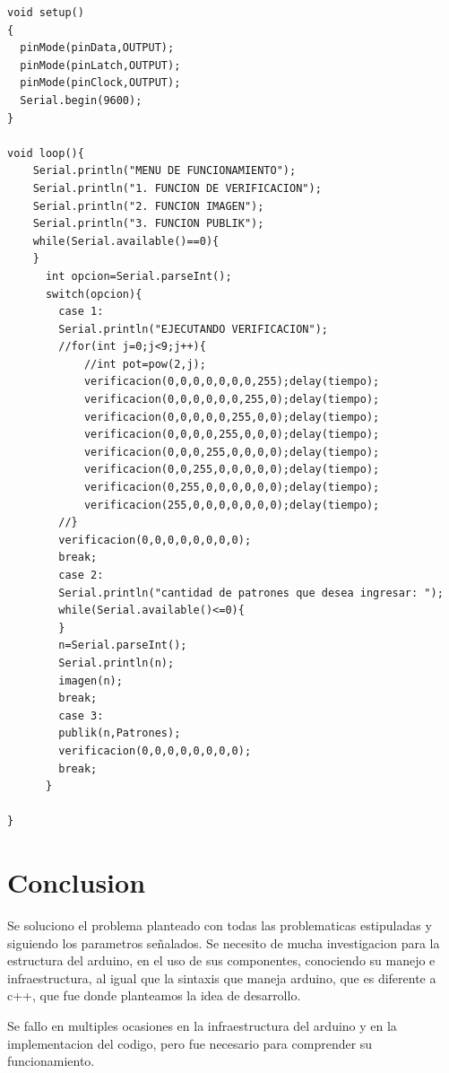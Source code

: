 \documentclass{article}
\begin{document}
\begin{verbatim}
void setup()
{
  pinMode(pinData,OUTPUT);
  pinMode(pinLatch,OUTPUT);
  pinMode(pinClock,OUTPUT);
  Serial.begin(9600);
}

void loop(){
  	Serial.println("MENU DE FUNCIONAMIENTO");
    Serial.println("1. FUNCION DE VERIFICACION");
    Serial.println("2. FUNCION IMAGEN");
    Serial.println("3. FUNCION PUBLIK");
    while(Serial.available()==0){
    }
      int opcion=Serial.parseInt();
      switch(opcion){
      	case 1:
        Serial.println("EJECUTANDO VERIFICACION");
        //for(int j=0;j<9;j++){
            //int pot=pow(2,j);
        	verificacion(0,0,0,0,0,0,0,255);delay(tiempo);
            verificacion(0,0,0,0,0,0,255,0);delay(tiempo);
            verificacion(0,0,0,0,0,255,0,0);delay(tiempo);
            verificacion(0,0,0,0,255,0,0,0);delay(tiempo);
            verificacion(0,0,0,255,0,0,0,0);delay(tiempo);
            verificacion(0,0,255,0,0,0,0,0);delay(tiempo);
            verificacion(0,255,0,0,0,0,0,0);delay(tiempo);
            verificacion(255,0,0,0,0,0,0,0);delay(tiempo);
        //}
        verificacion(0,0,0,0,0,0,0,0);
        break;
        case 2:
        Serial.println("cantidad de patrones que desea ingresar: ");
  		while(Serial.available()<=0){
  		}
  		n=Serial.parseInt();
  		Serial.println(n);
  		imagen(n);
        break;
        case 3:
        publik(n,Patrones);
        verificacion(0,0,0,0,0,0,0,0);
        break;
      }
    
}

\end{verbatim}

\vspace{7cm}

\section{Conclusion} \label{conclulsion}

Se soluciono el problema planteado con todas las problematicas estipuladas y siguiendo los parametros señalados. Se necesito de mucha investigacion para la estructura del arduino, en el uso de sus componentes, conociendo su manejo e infraestructura, al igual que la sintaxis que maneja arduino, que es diferente a c++, que fue donde planteamos la idea de desarrollo.

\vspace{1cm}

Se fallo en multiples ocasiones en la infraestructura del arduino y en la implementacion del codigo, pero fue necesario para comprender su funcionamiento.
\end{document}
